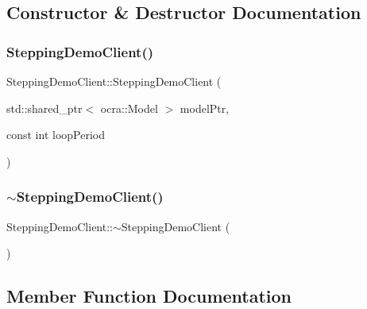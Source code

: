 \subsection{Constructor \& Destructor Documentation}
\hypertarget{classSteppingDemoClient_a28e41547ba5641741ceb3b378a5983db}{}\label{classSteppingDemoClient_a28e41547ba5641741ceb3b378a5983db} 
\subsubsection{\texorpdfstring{Stepping\+Demo\+Client()}{SteppingDemoClient()}}
{\footnotesize\ttfamily Stepping\+Demo\+Client\+::\+Stepping\+Demo\+Client (\begin{DoxyParamCaption}\item[{std\+::shared\+\_\+ptr$<$ ocra\+::\+Model $>$}]{model\+Ptr,  }\item[{const int}]{loop\+Period }\end{DoxyParamCaption})}

\hypertarget{classSteppingDemoClient_a573eed904c7262c5cdbaf6e254d72559}{}\label{classSteppingDemoClient_a573eed904c7262c5cdbaf6e254d72559} 
\subsubsection{\texorpdfstring{$\sim$\+Stepping\+Demo\+Client()}{~SteppingDemoClient()}}
{\footnotesize\ttfamily Stepping\+Demo\+Client\+::$\sim$\+Stepping\+Demo\+Client (\begin{DoxyParamCaption}{ }\end{DoxyParamCaption})\hspace{0.3cm}{\ttfamily [virtual]}}



\subsection{Member Function Documentation}
\hypertarget{classSteppingDemoClient_abf583698c8c03620516acf3ec6eb9e41}{}\label{classSteppingDemoClient_abf583698c8c03620516acf3ec6eb9e41} 
